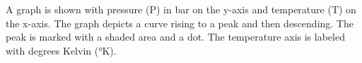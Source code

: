 A graph is shown with pressure (P) in bar on the y-axis and temperature (T) on the x-axis. The graph depicts a curve rising to a peak and then descending. The peak is marked with a shaded area and a dot. The temperature axis is labeled with degrees Kelvin (°K).